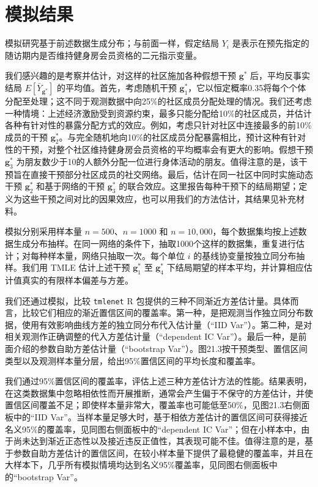 \section{模拟结果}

模拟研究基于前述数据生成分布；与前面一样，假定结局 $Y_i$ 是表示在预先指定的随访期内是否维持健身房会员资格的二元指示变量。

我们感兴趣的是考察并估计，对这样的社区施加各种假想干预 $\bm g^*$ 后，平均反事实结局 $E[\bar Y_{\bm g^*}]$ 的平均值。首先，考虑随机干预 $\bm g_1^*$，它以恒定概率0.35将每个个体分配至处理；这不同于观测数据中向25\%的社区成员分配处理的情况。我们还考虑一种情境：上述经济激励受到资源约束，最多只能分配给10\%的社区成员，并估计各种有针对性的暴露分配方式的效应。例如，考虑只针对社区中连接最多的前10\%成员的干预 $\bm g_2^*$。与完全随机地向10\%的社区成员分配暴露相比，预计这种有针对性的干预，对整个社区维持健身房会员资格的平均概率会有更大的影响。假想干预 $\bm g_3^*$ 为朋友数少于10的人额外分配一位进行身体活动的朋友。值得注意的是，该干预旨在直接干预部分社区成员的社交网络。最后，估计在同一社区中同时实施动态干预 $\bm g_2^*$ 和基于网络的干预 $\bm g_3^*$ 的联合效应。这里报告每种干预下的结局期望；定义为这些干预之间对比的因果效应，也可以用我们的方法估计，其结果见补充材料。

模拟分别采用样本量 $n=500$、$n=1000$ 和 $n=10{,}000$，每个数据集均按上述数据生成分布抽样。在同一网络的条件下，抽取1000个这样的数据集，重复进行估计；对每种样本量，网络只抽取一次。每个单位 $i$ 的基线协变量按独立同分布抽样。我们用 TMLE 估计上述干预 $\bm g_1^*$ 至 $\bm g_4^*$ 下结局期望的样本平均，并计算相应估计值真实的有限样本偏差与方差。

我们还通过模拟，比较 \texttt{tmlenet} R 包提供的三种不同渐近方差估计量。具体而言，比较它们相应的渐近置信区间的覆盖率。第一种，是把观测当作独立同分布数据，使用有效影响曲线方差的独立同分布代入估计量（“IID Var”）。第二种，是对相关观测作正确调整的代入方差估计量（“dependent IC Var”）。最后一种，是前面介绍的参数自助方差估计量（“bootstrap Var”）。图21.3按干预类型、置信区间类型以及观测样本量分层，给出95\%置信区间的平均长度和覆盖率。

我们通过95\%置信区间的覆盖率，评估上述三种方差估计方法的性能。结果表明，在这类数据集中忽略相依性而开展推断，通常会产生偏于不保守的方差估计，并使置信区间覆盖不足；即使样本量非常大，覆盖率也可能低至50\%，见图21.3右侧面板中的“IID Var”。当样本量足够大时，基于相依方差估计的置信区间可获得接近名义95\%的覆盖率，见同图右侧面板中的“dependent IC Var”；但在小样本中，由于尚未达到渐近正态性以及接近违反正值性，其表现可能不佳。值得注意的是，基于参数自助方差估计的置信区间，在较小样本量下提供了最稳健的覆盖率，并且在大样本下，几乎所有模拟情境均达到名义95\%覆盖率，见同图右侧面板中的“bootstrap Var”。

